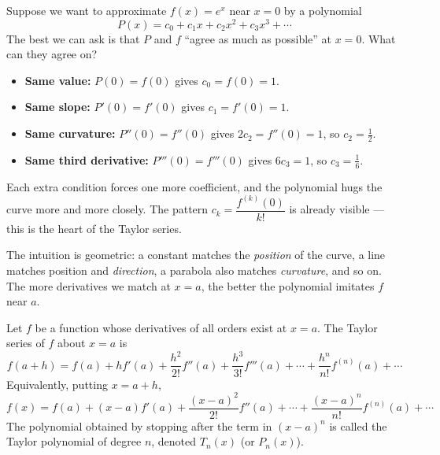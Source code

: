 \documentclass[11pt]{article}
\newcommand{\cle}[1]{{\popxbold\color{popdark}#1}}
\newcounter{popsec}
\newcounter{popsub}
\newcommand{\courssub}[1]{%
  \stepcounter{popsub}%
  \par\vspace{9pt}\noindent{\popxbold\fontsize{11.5}{13}\selectfont\color{popink}{\color{poporange}\thepopsec.\thepopsub}\hspace{6pt}#1}\par\nopagebreak\vspace{4pt}
}
\begin{document}
\begin{experience}
Suppose we want to approximate $f(x) = e^x$ near $x = 0$ by a polynomial
\[ P(x) = c_0 + c_1 x + c_2 x^2 + c_3 x^3 + \cdots \]
The best we can ask is that $P$ and $f$ ``agree as much as possible'' at $x = 0$. What can they agree on?

\begin{itemize}
\item \textbf{Same value:} $P(0) = f(0)$ gives $c_0 = f(0) = 1$.
\item \textbf{Same slope:} $P'(0) = f'(0)$ gives $c_1 = f'(0) = 1$.
\item \textbf{Same curvature:} $P''(0) = f''(0)$ gives $2c_2 = f''(0) = 1$, so $c_2 = \tfrac{1}{2}$.
\item \textbf{Same third derivative:} $P'''(0) = f'''(0)$ gives $6c_3 = 1$, so $c_3 = \tfrac{1}{6}$.
\end{itemize}

Each extra condition forces one more coefficient, and the polynomial hugs the curve more and more closely. The pattern $c_k = \dfrac{f^{(k)}(0)}{k!}$ is already visible --- this is the heart of the Taylor series.
\end{experience}

The intuition is geometric: a constant matches the \emph{position} of the curve, a line matches position and \emph{direction}, a parabola also matches \emph{curvature}, and so on. The more derivatives we match at $x = a$, the better the polynomial imitates $f$ near $a$.

\courssub{The Taylor series}

\begin{definition}[Taylor series of $f$ about $x = a$]
Let $f$ be a function whose derivatives of all orders exist at $x = a$. The \cle{Taylor series} of $f$ about $x = a$ is
\[ f(a+h) = f(a) + h f'(a) + \frac{h^2}{2!} f''(a) + \frac{h^3}{3!} f'''(a) + \cdots + \frac{h^n}{n!} f^{(n)}(a) + \cdots \]
Equivalently, putting $x = a + h$,
\[ f(x) = f(a) + (x-a) f'(a) + \frac{(x-a)^2}{2!} f''(a) + \cdots + \frac{(x-a)^n}{n!} f^{(n)}(a) + \cdots \]
The polynomial obtained by stopping after the term in $(x-a)^n$ is called the \cle{Taylor polynomial of degree $n$}, denoted $T_n(x)$ (or $P_n(x)$).
\end{definition}
\end{document}
